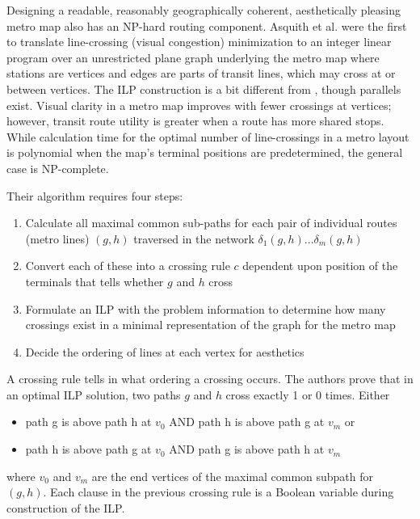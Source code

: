 \documentclass[twocolumn]{article}
\begin{document}
Designing a readable, reasonably geographically coherent, aesthetically pleasing metro map also has an
NP-hard\cite{argyriou} routing component. Asquith et al.\cite{asquith} were the first to
translate line-crossing (visual congestion) minimization to an integer linear program over an
unrestricted plane graph underlying the metro map where stations are vertices and edges are parts of
transit lines, which may cross at or between vertices. The ILP construction is a bit different from
\cite{behjat}, though parallels exist. Visual clarity in a metro map improves with fewer
crossings at vertices; however, transit route utility is greater when a route
has more shared stops. While calculation time for the optimal number of line-crossings in
a metro layout is polynomial when the map's terminal positions are predetermined\cite{nollenburg},
the general case is NP-complete.

Their algorithm requires four steps:
\begin{enumerate}
        \setlength{\itemsep}{0cm}
        \setlength{\parskip}{0cm}
        \belowdisplayskip=0pt
        \abovedisplayskip=0pt
    \item Calculate all maximal common sub-paths for each pair of individual routes (metro lines) $(g,h)$
        traversed in the network $\delta_{1}(g,h) ... \delta_{m}(g,h)$
    \item Convert each of these into a crossing rule $c$ dependent upon position of the terminals
        that tells whether $g$ and $h$ cross
    \item Formulate an ILP with the problem information to determine how many crossings exist in a minimal
        representation of the graph for the metro map
    \item Decide the ordering of lines at each vertex for aesthetics
\end{enumerate}

A crossing rule tells in what ordering a crossing occurs. The authors prove that in an optimal ILP solution,
two paths $g$ and $h$ cross exactly 1 or 0 times. Either
\begin{itemize}
        \setlength{\itemsep}{0cm}
        \setlength{\parskip}{0cm}
        \belowdisplayskip=0pt
        \abovedisplayskip=0pt
    \item path g is above path h at $v_0$ AND path h is above path g at $v_m$ or
    \item path h is above path g at $v_0$ AND path g is above path h at $v_m$
\end{itemize}
where $v_0$ and $v_m$ are the end vertices of the maximal common subpath for $(g,h)$. Each clause in the
previous crossing rule is a Boolean variable during construction of the ILP.
\end{document}
